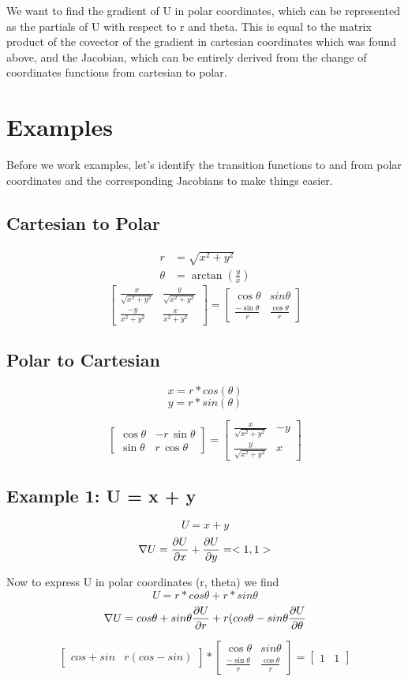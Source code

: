 \documentclass{article}
\newcommand{\showMatrixOne}{\ensuremath{
\begin{bmatrix}
\frac{x}{\sqrt{x^2 + y^2}} & \frac{y}{\sqrt{x^2 + y^2}} \\
\frac{-y}{x^2 + y^2}       & \frac{x}{x^2+y^2}          
\end{bmatrix}
}}
\newcommand{\showMatrixTwo}{\ensuremath{
\begin{bmatrix}
\cos\theta & sin\theta  \\
\frac{-\sin\theta}{r} &  \frac{\cos\theta}{r}
\end{bmatrix}
}}
\newcommand{\showMatrixThree}{\ensuremath{
\begin{bmatrix}
\cos\theta & -r\,\sin\theta  \\
\sin\theta &  r\,\cos\theta
\end{bmatrix}
}}
\newcommand{\showMatrixFour}{\ensuremath{
\begin{bmatrix}
\frac{x}{\sqrt{x^2 + y^2}} & -y \\
\frac{y}{\sqrt{x^2 + y^2}} & x     
\end{bmatrix}
}}
\begin{document}
We want to find the gradient of U in polar coordinates, which can be represented as the partials of U with respect to r and theta. This is equal to the matrix product of the covector of the gradient in cartesian coordinates which was found above, and the Jacobian, which can be entirely derived from the change of coordinates functions from cartesian to polar.

\section{Examples}

Before we work examples, let's identify the transition functions to and from polar coordinates and the corresponding Jacobians to make things easier.

\subsection{Cartesian to Polar}


\begin{align}
r &= \sqrt{x^2 + y^2} \\
\theta &= \arctan{\left(\frac{y}{x}\right)} 
\end{align}
\begin{equation}
\showMatrixOne
=
\showMatrixTwo
\end{equation}

\subsection{Polar to Cartesian}
\[ x = r * cos(\theta) \]
\[ y = r * sin (\theta)\]

\begin{equation}
\showMatrixThree 
=
\showMatrixFour
\end{equation}

\subsection{Example 1: U = x + y}
\[ U = x + y\]
\[\nabla U = \pdv{U}{x} + \pdv{U}{y} = <1,1>  \]

Now to express U in polar coordinates (r, theta) we find
\[ U = r*cos\theta + r*sin\theta  \]
\[\nabla U = cos\theta + sin \theta \pdv{U}{r} 
+ r (cos\theta - sin \theta \pdv{U}{\theta} \]

\begin{equation}
\begin{bmatrix}
cos + sin & r(cos-sin)
\end{bmatrix}
*
\begin{bmatrix}
\cos\theta & sin\theta  \\
\frac{-\sin\theta}{r} &  \frac{\cos\theta}{r}
\end{bmatrix}
=
\begin{bmatrix}
1 & 1
\end{bmatrix}
\end{equation}
\end{document}
